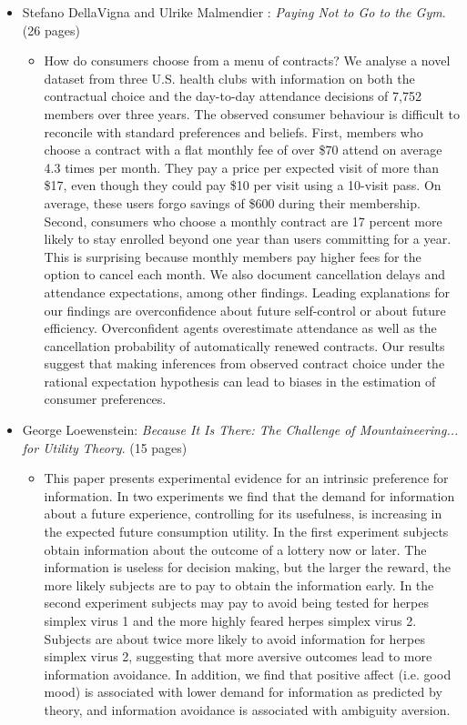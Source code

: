 \begin{itemize}
	\item Stefano DellaVigna and Ulrike Malmendier : \textit{Paying Not to Go to the Gym}. (26 pages)
		\begin{itemize}
			\item How do consumers choose from a menu of contracts? We analyse a novel dataset from three U.S. health clubs with information on both the contractual choice and the day-to-day attendance decisions of 7,752 members over three years. The observed consumer behaviour is difficult to reconcile with standard preferences and beliefs. First, members who choose a contract with a flat monthly fee of over \$70 attend on average 4.3 times per month. They pay a price per expected visit of more than \$17, even though they could pay \$10 per visit using a 10-visit pass. On average, these users forgo savings of \$600 during their membership. Second, consumers who choose a monthly contract are 17 percent more likely to stay enrolled beyond one year than users committing for a year. This is surprising because monthly members pay higher fees for the option to cancel each month. We also document cancellation delays and attendance expectations, among other findings. Leading explanations for our findings are overconfidence about future self-control or about future efficiency. Overconfident agents overestimate attendance as well as the cancellation probability of automatically renewed contracts. Our results suggest that making inferences from observed contract choice under the rational expectation hypothesis can lead to biases in the estimation of consumer preferences.
		\end{itemize}
	\item George Loewenstein: \textit{Because It Is There: The Challenge of Mountaineering... for Utility Theory}. (15 pages)
		\begin{itemize}
			\item This paper presents experimental evidence for an intrinsic preference for information. In two experiments we find that the demand for information about a future experience, controlling for its usefulness, is increasing in the expected future consumption utility. In the first experiment subjects obtain information about the outcome of a lottery now or later. The information is useless for decision making, but the larger the reward, the more likely subjects are to pay to obtain the information early. In the second experiment subjects may pay to avoid being tested for herpes simplex virus 1 and the more highly feared herpes simplex virus 2. Subjects are about twice more likely to avoid information for herpes simplex virus 2, suggesting that more aversive outcomes lead to more information avoidance. In addition, we find that positive affect (i.e. good mood) is associated with lower demand for information as predicted by theory, and information avoidance is associated with ambiguity aversion.

\end{itemize}
\end{itemize}
